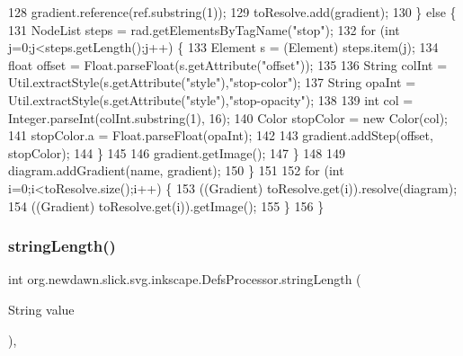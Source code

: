 \begin{DoxyCode}
128                 gradient.reference(ref.substring(1));
129                 toResolve.add(gradient);
130             \} \textcolor{keywordflow}{else} \{
131                 NodeList steps = rad.getElementsByTagName(\textcolor{stringliteral}{"stop"});
132                 \textcolor{keywordflow}{for} (\textcolor{keywordtype}{int} j=0;j<steps.getLength();j++) \{
133                     Element s = (Element) steps.item(j);
134                     \textcolor{keywordtype}{float} offset = Float.parseFloat(s.getAttribute(\textcolor{stringliteral}{"offset"}));
135         
136                     String colInt = Util.extractStyle(s.getAttribute(\textcolor{stringliteral}{"style"}),\textcolor{stringliteral}{"stop-color"});
137                     String opaInt = Util.extractStyle(s.getAttribute(\textcolor{stringliteral}{"style"}),\textcolor{stringliteral}{"stop-opacity"});
138                     
139                     \textcolor{keywordtype}{int} col = Integer.parseInt(colInt.substring(1), 16);
140                     Color stopColor = \textcolor{keyword}{new} Color(col);
141                     stopColor.a = Float.parseFloat(opaInt);
142                     
143                     gradient.addStep(offset, stopColor);
144                 \}
145                 
146                 gradient.getImage();
147             \}
148             
149             diagram.addGradient(name, gradient);
150         \}
151         
152         \textcolor{keywordflow}{for} (\textcolor{keywordtype}{int} i=0;i<toResolve.size();i++) \{
153             ((Gradient) toResolve.get(i)).resolve(diagram);
154             ((Gradient) toResolve.get(i)).getImage();
155         \}
156     \}
\end{DoxyCode}
\mbox{\label{classorg_1_1newdawn_1_1slick_1_1svg_1_1inkscape_1_1_defs_processor_ab7a770c192ded7ccb0655791369c2475}} 
\subsubsection{\texorpdfstring{string\+Length()}{stringLength()}}
{\footnotesize\ttfamily int org.\+newdawn.\+slick.\+svg.\+inkscape.\+Defs\+Processor.\+string\+Length (\begin{DoxyParamCaption}\item[{String}]{value }\end{DoxyParamCaption})\hspace{0.3cm}{\ttfamily [inline]}, {\ttfamily [private]}}

